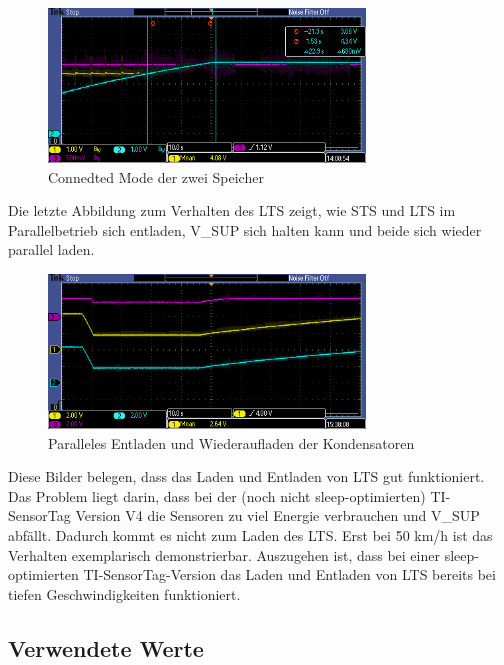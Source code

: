 \begin{figure}[ht]
   \includegraphics[width=0.75\textwidth]{4Resultate/imag/STS_LTS_connect.PNG}
    \caption{Connedted Mode der zwei Speicher}
    \label{connected_mode}
\end{figure}

Die letzte Abbildung zum Verhalten des LTS zeigt, wie STS und LTS im Parallelbetrieb sich entladen, V\_SUP sich halten kann und beide sich wieder parallel laden. 

\begin{figure}[ht]
   \includegraphics[width=0.75\textwidth]{4Resultate/imag/pic1.PNG}
    \caption{Paralleles Entladen und Wiederaufladen der Kondensatoren}
    \label{parallel_entladen}
\end{figure}

Diese Bilder belegen, dass das Laden und Entladen von LTS gut funktioniert. Das Problem liegt darin, dass bei der (noch nicht sleep-optimierten) TI-SensorTag Version V4 die Sensoren zu viel Energie verbrauchen und V\_SUP abfällt. Dadurch kommt es nicht zum Laden des LTS. Erst bei 50 km/h ist das Verhalten exemplarisch demonstrierbar. Auszugehen ist, dass bei einer sleep-optimierten TI-SensorTag-Version das Laden und Entladen von LTS bereits bei tiefen Geschwindigkeiten funktioniert.

\subsection{Verwendete Werte}
\label{werte}

